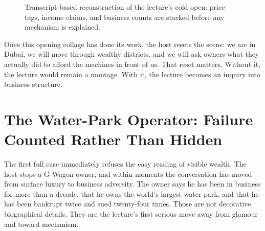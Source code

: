 \begin{figure}[h]
\centering
{}
\caption{Transcript-based reconstruction of the lecture's cold open: price tags, income claims, and business counts are stacked before any mechanism is explained.}
\end{figure}

Once this opening collage has done its work, the host resets the scene: we are in Dubai, we will move through wealthy districts, and we will ask owners what they actually did to afford the machines in front of us. That reset matters. Without it, the lecture would remain a montage. With it, the lecture becomes an inquiry into business structure.

\section{The Water-Park Operator: Failure Counted Rather Than Hidden}

The first full case immediately refuses the easy reading of visible wealth. The host stops a G-Wagon owner, and within moments the conversation has moved from surface luxury to business adversity. The owner says he has been in business for more than a decade, that he owns the world's largest water park, and that he has been bankrupt twice and sued twenty-four times. Those are not decorative biographical details. They are the lecture's first serious move away from glamour and toward mechanism.

